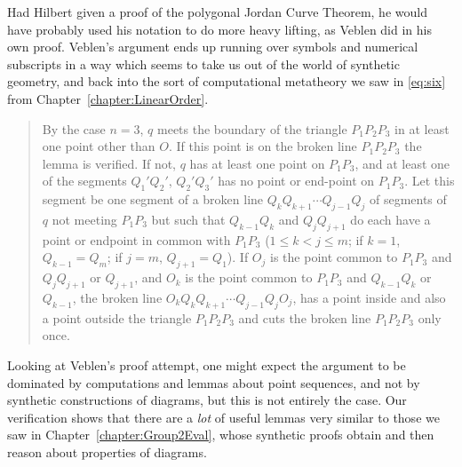 Had Hilbert given a proof of the polygonal Jordan Curve Theorem, he would have probably used his notation to do more heavy lifting, as Veblen did in his own proof. Veblen's argument ends up running over symbols and numerical subscripts in a way which seems to take us out of the world of synthetic geometry, and back into the sort of computational metatheory we saw in \ref{eq:six} from Chapter~\ref{chapter:LinearOrder}.
\begin{quotation}
  By the case $n=3$, $q$ meets the boundary of the triangle $P_1P_2P_3$ in at least one point other than $O$. If this point is on the broken line $P_1P_2P_3$ the lemma is verified. If not, $q$ has at least one point on $P_1P_3$, and at least one of the segments $Q_1'Q_2'$, $Q_2'Q_3'$ has no point or end-point on $P_1P_3$. Let this segment be one segment of a broken line $Q_kQ_{k+1}\cdots Q_{j-1}Q_j$ of segments of $q$ not meeting $P_1P_3$ but such that $Q_{k-1}Q_k$ and $Q_jQ_{j+1}$ do each have a point or endpoint in common with $P_1P_3$ ($1 \leq k < j \leq m$; if $k = 1$, $Q_{k-1} = Q_m$; if $j = m$, $Q_{j+1} = Q_1$). If $O_j$ is the point common to $P_1P_3$ and $Q_jQ_{j+1}$ or $Q_{j+1}$, and $O_k$ is the point common to $P_1P_3$ and $Q_{k-1}Q_k$ or $Q_{k-1}$, the broken line $O_kQ_kQ_{k+1}\cdots Q_{j-1}Q_jO_j$, has a point inside and also a point outside the triangle $P_1P_2P_3$ and cuts the broken line $P_1P_2P_3$ only once.
\end{quotation}
Looking at Veblen's proof attempt, one might expect the argument to be dominated by computations and lemmas about point sequences, and not by synthetic constructions of diagrams, but this is not entirely the case. Our verification shows that there are a \emph{lot} of useful lemmas very similar to those we saw in Chapter~\ref{chapter:Group2Eval}, whose synthetic proofs obtain and then reason about properties of diagrams.



